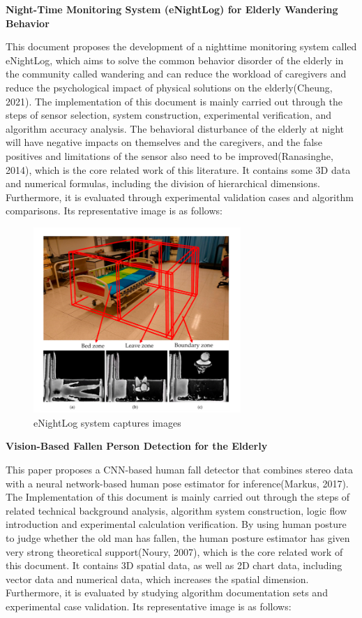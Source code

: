 \documentclass[12pt]{article}
\begin{document}
\noindent \textbf{Night-Time Monitoring System (eNightLog) for Elderly Wandering Behavior}

\noindent This document proposes the development of a nighttime monitoring system called eNightLog, which aims to solve the common behavior disorder of the elderly in the community called wandering and can reduce the workload of caregivers and reduce the psychological impact of physical solutions on the elderly(Cheung, 2021). The implementation of this document is mainly carried out through the steps of sensor selection, system construction, experimental verification, and algorithm accuracy analysis. The behavioral disturbance of the elderly at night will have negative impacts on themselves and the caregivers, and the false positives and limitations of the sensor also need to be improved(Ranasinghe, 2014), which is the core related work of this literature. It contains some 3D data and numerical formulas, including the division of hierarchical dimensions. Furthermore, it is evaluated through experimental validation cases and algorithm comparisons. Its representative image is as follows:

\begin{figure}[H]
\centering
\includegraphics[width=0.7\textwidth]{Paper3.pic.jpg}
\caption{eNightLog system captures images} 
\end{figure}

\noindent \textbf{Vision-Based Fallen Person Detection for the Elderly}

\noindent This paper proposes a CNN-based human fall detector that combines stereo data with a neural network-based human pose estimator for inference(Markus, 2017). The Implementation of this document is mainly carried out through the steps of related technical background analysis, algorithm system construction, logic flow introduction and experimental calculation verification. By using human posture to judge whether the old man has fallen, the human posture estimator has given very strong theoretical support(Noury, 2007), which is the core related work of this document. It contains 3D spatial data, as well as 2D chart data, including vector data and numerical data, which increases the spatial dimension. Furthermore, it is evaluated by studying algorithm documentation sets and experimental case validation. Its representative image is as follows:
\end{document}

